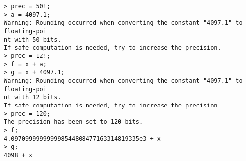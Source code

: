 \begin{center}\begin{minipage}{15cm}\begin{Verbatim}[frame=single]
> prec = 50!;
> a = 4097.1;
Warning: Rounding occurred when converting the constant "4097.1" to floating-poi
nt with 50 bits.
If safe computation is needed, try to increase the precision.
> prec = 12!;
> f = x + a;
> g = x + 4097.1;
Warning: Rounding occurred when converting the constant "4097.1" to floating-poi
nt with 12 bits.
If safe computation is needed, try to increase the precision.
> prec = 120;
The precision has been set to 120 bits.
> f;
4.097099999999998544808477163314819335e3 + x
> g;
4098 + x
\end{Verbatim}
\end{minipage}\end{center}
